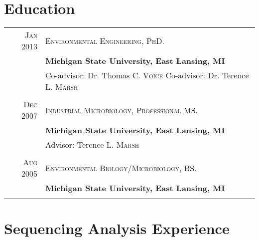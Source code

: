 \documentclass[letterpaper,10pt]{article} %
\begin{document}

\section{Education}

\begin{tabular}{rl}	
\textsc{Jan} 2013 & \textsc{Environmental Engineering, PhD.}\\
& \textbf{Michigan State University, East Lansing, MI}\\
& \small Co-advisor: Dr. Thomas C. \textsc{Voice} {\hfill Co-advisor: Dr. Terence L. \textsc{Marsh}}\\
&\\


\textsc{Dec} 2007 & \textsc{Industrial Microbiology, Professional MS.}\\
& \textbf{Michigan State University, East Lansing, MI}\\
& \small Advisor: Terence L. \textsc{Marsh}\\
&\\


\textsc{Aug} 2005 & \textsc{Environmental Biology/Microbiology, BS.}\\
& \textbf{Michigan State University, East Lansing, MI}\\
&\\


\end{tabular}


\section{Sequencing Analysis Experience}
\end{document}
